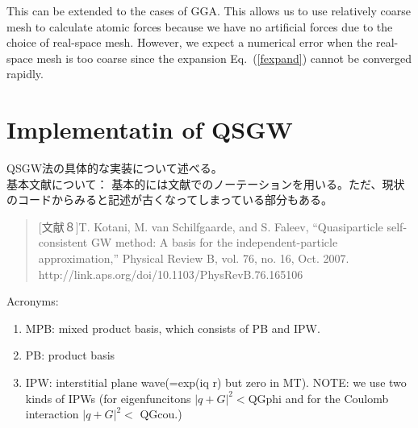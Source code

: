 \documentclass[a4paper,10pt,aip,onecolumn,amsmath,amssymb,floatfix,rmp]{revtex4-1}
\newcommand{\req}[1]{\mbox{Eq.~\!(\ref{#1})}}
\begin{document}
This can be extended to the cases of GGA. 
This allows us to use relatively coarse mesh to calculate 
atomic forces because we have no artificial forces due to the choice 
of real-space mesh. However, we expect a numerical error when the real-space
mesh is too coarse since the expansion \req{fexpand} cannot be
converged rapidly.


\section{Implementatin of QSGW}
\label{sec:qsgwformalism}
QSGW法の具体的な実装について述べる。\\

\noindent 基本文献について：
基本的には文献\cite{kotani07a}でのノーテーションを用いる。ただ、現状のコードからみると記述が古くなってしまっている部分もある。
\begin{quote}
[文献８]T. Kotani, M. van Schilfgaarde, and S. Faleev, “Quasiparticle
self-consistent GW method: 
A basis for the independent-particle approximation,” Physical Review B, vol. 76, no. 16, Oct. 2007.
http://link.aps.org/doi/10.1103/PhysRevB.76.165106
\end{quote}

\noindent Acronyms:
\begin{enumerate}
\item[]
MPB: mixed product basis, which consists of PB and IPW.
\item[]
PB: product basis
\item[]
IPW: interstitial plane wave(=exp(iq r) but zero in MT). NOTE: we use
       two kinds of IPWs (for eigenfuncitons $|q+G|^2<$QGphi and for
       the Coulomb interaction $|q+G|^2<$ QGcou.)
\end{enumerate}
\end{document}
